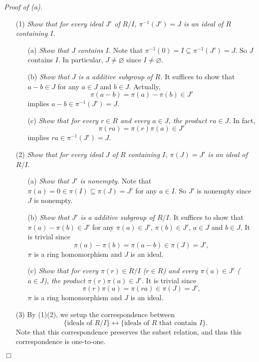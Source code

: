 \documentclass{article}
\begin{document}
\emph{Proof of (a).}
\begin{enumerate}
\item[(1)]
  \emph{Show that for every ideal $J'$ of $R/I$,
  $\pi^{-1}(J') = J$ is an ideal of $R$ containing $I$.}
  \begin{enumerate}
  \item[(a)]
    \emph{Show that $J$ contains $I$.}
    Note that $\pi^{-1}(0) = I \subseteq \pi^{-1}(J') = J$.
    So $J$ contains $I$. In particular, $J \neq \varnothing$ since $I \neq \varnothing$.

  \item[(b)]
    \emph{Show that $J$ is a additive subgroup of $R$.}
    It suffices to show that
    $a - b \in J$
    for any $a \in J$ and $b \in J$.
    Actually,
    \[
      \pi(a - b) = \pi(a) - \pi(b) \in J'
    \]
    implies $a - b \in \pi^{-1}(J') = J$.

  \item[(c)]
    \emph{Show that for every $r \in R$ and every $a \in J$,
    the product $ra \in J$.}
    In fact,
    \[
      \pi(ra) = \pi(r) \pi(a) \in J'
    \]
    implies $ra \in \pi^{-1}(J') = J$.
  \end{enumerate}

\item[(2)]
  \emph{Show that for every ideal $J$ of $R$ containing $I$,
  $\pi(J) = J'$ is an ideal of $R/I$.}
  \begin{enumerate}
  \item[(a)]
    \emph{Show that $J'$ is nonempty.}
    Note that $\pi(a) = 0 \in \pi(I) \subseteq \pi(J) = J'$ for any $a \in I$.
    So $J'$ is nonempty since $J$ is nonempty.

  \item[(b)]
    \emph{Show that $J'$ is a additive subgroup of $R/I$.}
    It suffices to show that
    $\pi(a) - \pi(b) \in J'$ for any $\pi(a) \in J'$, $\pi(b) \in J'$, $a \in J$ and $b \in J$.
    It is trivial since
    \[
      \pi(a) - \pi(b) = \pi(a - b) \in \pi(J) = J',
    \]
    $\pi$ is a ring homomorphism and $J$ is an ideal.

  \item[(c)]
    \emph{Show that for every $\pi(r) \in R/I$ ($r \in R$) and every $\pi(a) \in J'$ ($a \in J$),
    the product $\pi(r)\pi(a) \in J'$.}
    It is trivial since
    \[
      \pi(r)\pi(a) = \pi(ra) \in \pi(J) = J',
    \]
    $\pi$ is a ring homomorphism and $J$ is an ideal.
  \end{enumerate}

\item[(3)]
  By (1)(2), we setup the correspondence between
  \[
    \{ \text{ideals of $R/I$} \}
    \longleftrightarrow
    \{ \text{ideals of $R$ that contain $I$} \}.
  \]
  Note that this correspondence preserves the subset relation,
  and thus this correspondence is one-to-one.
\end{enumerate}
$\Box$ \\
\end{document}
